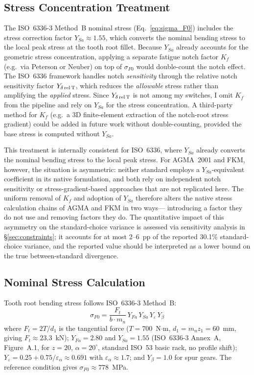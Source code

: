 \documentclass[12pt,a4paper]{article}
\begin{document}
\subsection{Stress Concentration Treatment}

The ISO~6336-3 Method~B nominal stress (Eq.~\ref{eq:sigma_F0}) includes
the stress correction factor $Y_{Sa} \approx 1.55$, which converts the
nominal bending stress to the local peak stress at the tooth root
fillet. Because $Y_{Sa}$ already accounts for the geometric stress
concentration, applying a separate fatigue notch factor $K_f$ (e.g.\
via Peterson or Neuber) on top of $\sigma_{F0}$ would double-count the
notch effect. The ISO~6336 framework handles notch \emph{sensitivity}
through the relative notch sensitivity factor $Y_{\delta\,\rm rel\,T}$,
which reduces the \emph{allowable} stress rather than amplifying the
\emph{applied} stress. Since $Y_{\delta\,\rm rel\,T}$ is not among my
switches, I omit $K_f$ from the pipeline and rely on $Y_{Sa}$ for the
stress concentration. A third-party method for $K_f$ (e.g.\ a 3D
finite-element extraction of the notch-root stress gradient) could be
added in future work without double-counting, provided the base stress
is computed without $Y_{Sa}$.

This treatment is internally consistent for ISO~6336, where $Y_{Sa}$
already converts the nominal bending stress to the local peak stress.
For AGMA~2001 and FKM, however, the situation is asymmetric: neither
standard employs a $Y_{Sa}$-equivalent coefficient in its native
formulation, and both rely on independent notch sensitivity or
stress-gradient-based approaches that are not replicated here. The
uniform removal of $K_f$ and adoption of $Y_{Sa}$ therefore alters the
native stress calculation chains of AGMA and FKM in two ways---%
introducing a factor they do not use and removing factors they do.
The quantitative impact of this asymmetry on the standard-choice
variance is assessed via sensitivity analysis in \S\ref{sec:constraints}; it accounts for at most 2--6~pp of the
reported 30.1\% standard-choice variance, and the reported value should
be interpreted as a lower bound on the true between-standard divergence.

\subsection{Nominal Stress Calculation}

Tooth root bending stress follows ISO~6336-3 Method~B:
\begin{equation}
\label{eq:sigma_F0}
\sigma_{F0} = \frac{F_t}{b \cdot m_n} \,
Y_{Fa} \, Y_{Sa} \, Y_\varepsilon \, Y_\beta
\end{equation}
where $F_t = 2T/d_1$ is the tangential force ($T=700$~N$\cdot$m,
$d_1 = m_n z_1 = 60$~mm, giving $F_t \approx 23.3$~kN);
$Y_{Fa}=2.80$ and $Y_{Sa}=1.55$ (ISO~6336-3 Annex~A, Figure~A.1,
for $z=20$, $\alpha=20^\circ$, standard ISO~53 basic rack, no profile
shift); $Y_\varepsilon = 0.25 + 0.75/\varepsilon_\alpha \approx 0.691$
with $\varepsilon_\alpha \approx 1.7$; and $Y_\beta = 1.0$ for spur
gears. The reference condition gives $\sigma_{F0} \approx 778$~MPa.
\end{document}
